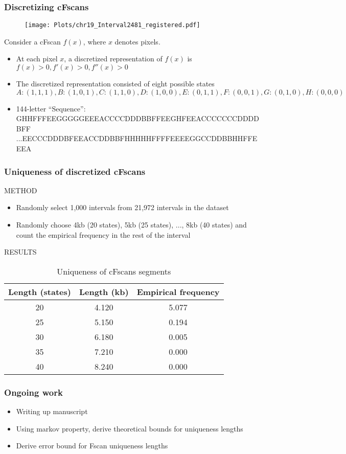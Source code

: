 \documentclass[10pt,dvipsnames,table]{beamer}
\begin{document}
\begin{frame}
\frametitle{Discretizing cFscans}
\footnotesize
\vspace{-0.5cm}
\begin{figure}
\centering
\texttt{[image: Plots/chr19\_Interval2481\_registered.pdf]}
\end{figure}
\vspace{-0.5cm}
Consider a cFscan $f(x)$, where $x$ denotes pixels.
\begin{itemize}
\item At each pixel $x$, a discretized representation of $f(x)$ is $f(x) > 0, f'(x) > 0, f''(x) > 0$
\item The discretized representation consisted of eight possible states $A: (1,1,1), B:(1,0,1), C:(1,1,0), D:(1,0,0), E:(0,1,1), F:(0,0,1), G:(0,1,0), H:(0,0,0)$
\item 144-letter ``Sequence'': GHHFFFEEGGGGGEEEACCCCDDDBBFFEEGHFEEACCCCCCCDDDDBFF ...EECCCDDDBFEEACCDDBBFHHHHHFFFFEEEEGGCCDDBBHHFFEEEA
\end{itemize}

\end{frame}

\begin{frame}
\frametitle{Uniqueness of discretized cFscans}
METHOD
\begin{itemize}
\item Randomly select 1,000 intervals from 21,972 intervals in the dataset
\item Randomly choose 4kb (20 states), 5kb (25 states), ..., 8kb (40 states) and count the empirical frequency in the rest of the interval
\end{itemize}

RESULTS
\begin{table}[H]
\centering
\caption{Uniqueness of cFscans segments} 
\begin{tabular}{c|c|c}
\hline
\hline
Length (states) & Length (kb) 	& Empirical frequency 	\\
\hline
20 		& 4.120		& 5.077 		\\
25		& 5.150		& 0.194			\\
30		& 6.180		& 0.005			\\
35		& 7.210		& 0.000			\\
40		& 8.240		& 0.000			\\
\hline
\hline
\end{tabular}
\end{table}
\end{frame}

\begin{frame}
\frametitle{Ongoing work}
\begin{itemize}
\item Writing up manuscript
\item Using markov property, derive theoretical bounds for uniqueness lengths
\item Derive error bound for Fscan uniqueness lengths
\end{itemize}
\end{frame}
\end{document}
